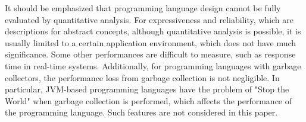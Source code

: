 It should be emphasized that programming language design cannot be fully
evaluated by quantitative analysis.
For expressiveness and reliability, which are descriptions for abstract concepts,
although quantitative analysis is possible, it is usually limited to a certain
application environment, which does not have much significance.
Some other performances are difficult to measure, such as response time in real-time systems.
Additionally, for programming languages with garbage collectors, the performance
loss from garbage collection is not negligible.
In particular, JVM-based programming languages have the problem of "Stop the World"
when garbage collection is performed\cite{gidra2013study},
which affects the performance of the programming language.
Such features are not considered in this paper.